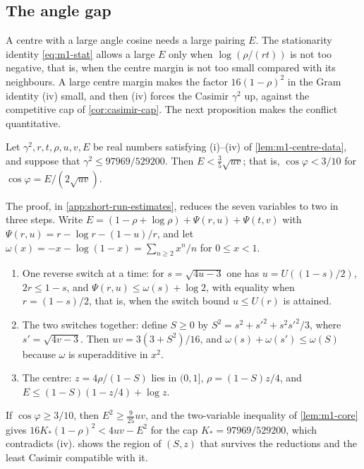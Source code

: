 \subsection{The angle gap}

A centre with a large angle cosine needs a large pairing $E$. The stationarity identity
\eqref{eq:m1-stat} allows a large $E$ only when $\log(\rho/(rt))$ is not too negative, that is,
when the centre margin is not too small compared with its neighbours. A large centre margin makes
the factor $16(1-\rho)^2$ in the Gram identity (iv) small, and then (iv) forces the Casimir
$\gamma^2$ up, against the competitive cap of \cref{cor:casimir-cap}. The next proposition makes
the conflict quantitative.

\begin{proposition}\label{prop:m1-angle-gap}
  Let $\gamma^2,r,t,\rho,u,v,E$ be real numbers satisfying \textup{(i)--(iv)} of
  \cref{lem:m1-centre-data}, and suppose that $\gamma^2\le 97969/529200$. Then
  $E<\frac35\sqrt{uv}$; that is, $\cos\varphi<3/10$ for $\cos\varphi=E/(2\sqrt{uv})$.
\end{proposition}

The proof, in \cref{app:short-run-estimates}, reduces the seven variables to two in three steps.
Write $E=(1-\rho+\log\rho)+\Psi(r,u)+\Psi(t,v)$ with $\Psi(r,u)=r-\log r-(1-u)/r$, and let
$\omega(x)=-x-\log(1-x)=\sum_{n\ge2}x^n/n$ for $0\le x<1$.
\begin{enumerate}[label=(\alph*)]
  \item One reverse switch at a time: for $s=\sqrt{4u-3}$ one has $u=U((1-s)/2)$, $2r\le 1-s$, and
  $\Psi(r,u)\le\omega(s)+\log2$, with equality when $r=(1-s)/2$, that is, when the switch bound
  $u\le U(r)$ is attained.
  \item The two switches together: define $S\ge0$ by $S^2=s^2+s'^2+s^2s'^2/3$, where
  $s'=\sqrt{4v-3}$. Then $uv=3(3+S^2)/16$, and $\omega(s)+\omega(s')\le\omega(S)$ because
  $\omega$ is superadditive in $x^2$.
  \item The centre: $z=4\rho/(1-S)$ lies in $(0,1]$, $\rho=(1-S)z/4$, and
  $E\le(1-S)(1-z/4)+\log z$.
\end{enumerate}
If $\cos\varphi\ge3/10$, then $E^2\ge\frac{9}{25}uv$, and the two-variable inequality of
\cref{lem:m1-core} gives $16K_*(1-\rho)^2<4uv-E^2$ for the cap $K_*=97969/529200$, which
contradicts (iv).  shows the region of $(S,z)$ that survives the
reductions and the least Casimir compatible with it.

